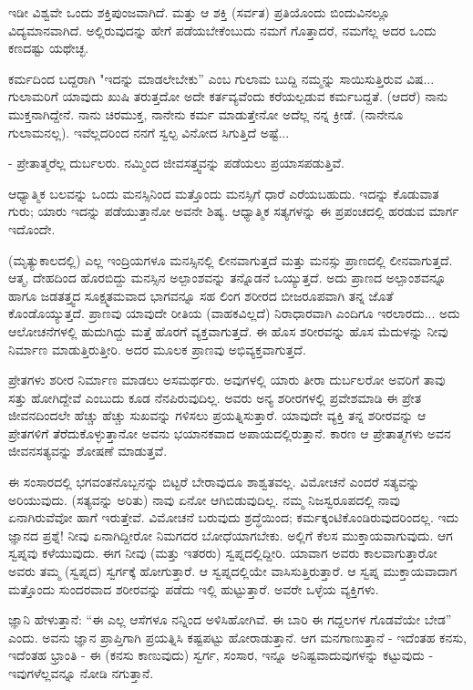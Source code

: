 ಇಡೀ ವಿಶ್ವವೇ ಒಂದು ಶಕ್ತಿಪುಂಜವಾಗಿದೆ. ಮತ್ತು ಆ ಶಕ್ತಿ (ಸರ್ವತ) ಪ್ರತಿಯೊಂದು ಬಿಂದುವಿನಲ್ಲೂ ವಿದ್ಯಮಾನವಾಗಿದೆ. ಅಲ್ಲಿರುವುದನ್ನು ಹೇಗೆ ಪಡೆಯಬೇಕೆಂಬುದು ನಮಗೆ ಗೊತ್ತಾದರೆ, ನಮಗೆಲ್ಲ ಅದರ ಒಂದು ಕಣದಷ್ಟು ಯಥೇಚ್ಛ.

ಕರ್ಮದಿಂದ ಬದ್ದರಾಗಿ "ಇದನ್ನು ಮಾಡಲೇಬೇಕು” ಎಂಬ ಗುಲಾಮ ಬುದ್ದಿ ನಮ್ಮನ್ನು ಸಾಯಿಸುತ್ತಿರುವ ವಿಷ... ಗುಲಾಮರಿಗೆ ಯಾವುದು ಖುಷಿ ತರುತ್ತದೋ ಅದೇ ಕರ್ತವ್ಯವೆಂದು ಕರೆಯಲ್ಪಡುವ ಕರ್ಮಬದ್ದತೆ. (ಆದರೆ) ನಾನು ಮುಕ್ತನಾಗಿದ್ದೇನೆ. ನಾನು ಚಿರಮುಕ್ತ, ನಾನೇನು ಕರ್ಮ ಮಾಡುತ್ತೇನೋ ಅದೆಲ್ಲ ನನ್ನ ಕ್ರೀಡೆ. (ನಾನೇನೂ ಗುಲಾಮನಲ್ಲ). ಇವೆಲ್ಲದರಿಂದ ನನಗೆ ಸ್ವಲ್ಪ ವಿನೋದ ಸಿಗುತ್ತಿದೆ ಅಷ್ಟೆ...

- ಪ್ರೇತಾತ್ಮರೆಲ್ಲ ದುರ್ಬಲರು. ನಮ್ಮಿಂದ ಜೀವಸತ್ತ್ವವನ್ನು ಪಡೆಯಲು ಪ್ರಯಾಸಪಡುತ್ತಿವೆ.

ಆಧ್ಯಾತ್ಮಿಕ ಬಲವನ್ನು ಒಂದು ಮನಸ್ಸಿನಿಂದ ಮತ್ತೊಂದು ಮನಸ್ಸಿಗೆ ಧಾರೆ ಎರೆಯಬಹುದು. ಇದನ್ನು ಕೊಡುವಾತ ಗುರು; ಯಾರು ಇದನ್ನು ಪಡೆಯುತ್ತಾನೋ ಅವನೇ ಶಿಷ್ಯ. ಆಧ್ಯಾತ್ಮಿಕ ಸತ್ಯಗಳನ್ನು ಈ ಪ್ರಪಂಚದಲ್ಲಿ ಹರಡುವ ಮಾರ್ಗ ಇದೊಂದೇ.

(ಮೃತ್ಯುಕಾಲದಲ್ಲಿ) ಎಲ್ಲ ಇಂದ್ರಿಯಗಳೂ ಮನಸ್ಸಿನಲ್ಲಿ ಲೀನವಾಗುತ್ತದೆ ಮತ್ತು ಮನಸ್ಸು ಪ್ರಾಣದಲ್ಲಿ ಲೀನವಾಗುತ್ತದೆ. ಆತ್ಮ, ದೇಹದಿಂದ ಹೊರಬಿದ್ದು ಮನಸ್ಸಿನ ಅಲ್ಪಾಂಶವನ್ನು ತನ್ನೊಡನೆ ಒಯ್ಯುತ್ತದೆ. ಅದು ಪ್ರಾಣದ ಅಲ್ಪಾಂಶವನ್ನೂ ಹಾಗೂ ಜಡತತ್ತ್ವದ ಸೂಕ್ಷ್ಮತಮವಾದ ಭಾಗವನ್ನೂ ಸಹ ಲಿಂಗ ಶರೀರದ ಬೀಜರೂಪವಾಗಿ ತನ್ನ ಜೊತೆ ಕೊಂಡೊಯ್ಯುತ್ತದೆ. ಪ್ರಾಣವು ಯಾವುದೇ ರೀತಿಯ (ವಾಹಕವಿಲ್ಲದೆ) ನಿರಾಧಾರವಾಗಿ ಎಂದಿಗೂ ಇರಲಾರದು... ಅದು ಆಲೋಚನೆಗಳಲ್ಲಿ ಹುದುಗಿದ್ದು ಮತ್ತೆ ಹೊರಗೆ ವ್ಯಕ್ತವಾಗುತ್ತದೆ. ಈ ಹೊಸ ಶರೀರವನ್ನು ಹೊಸ ಮೆದುಳನ್ನು ನೀವು ನಿರ್ಮಾಣ ಮಾಡುತ್ತಿರುತ್ತೀರಿ. ಅದರ ಮೂಲಕ ಪ್ರಾಣವು ಅಭಿವ್ಯಕ್ತವಾಗುತ್ತದೆ.

ಪ್ರೇತಗಳು ಶರೀರ ನಿರ್ಮಾಣ ಮಾಡಲು ಅಸಮರ್ಥರು. ಅವುಗಳಲ್ಲಿ ಯಾರು ತೀರಾ ದುರ್ಬಲರೋ ಅವರಿಗೆ ತಾವು ಸತ್ತು ಹೋಗಿದ್ದೇವೆ ಎಂಬುದು ಕೂಡ ನೆನಪಿರುವುದಿಲ್ಲ. ಅವರು ಅನ್ಯ ಶರೀರಗಳಲ್ಲಿ ಪ್ರವೇಶಮಾಡಿ ಈ ಪ್ರೇತ ಜೀವನದಿಂದಲೇ ಹೆಚ್ಚು ಹೆಚ್ಚು ಸುಖವನ್ನು ಗಳಿಸಲು ಪ್ರಯತ್ನಿಸುತ್ತಾರೆ. ಯಾವುದೇ ವ್ಯಕ್ತಿ ತನ್ನ ಶರೀರವನ್ನು ಆ ಪ್ರೇತಗಳಿಗೆ ತೆರೆದುಕೊಳ್ಳುತ್ತಾನೋ ಅವನು ಭಯಾನಕವಾದ ಅಪಾಯದಲ್ಲಿರುತ್ತಾನೆ. ಕಾರಣ ಆ ಪ್ರೇತಾತ್ಮಗಳು ಅವನ ಜೀವನಸತ್ಯವನ್ನು ಶೋಷಣೆ ಮಾಡುತ್ತವೆ.

ಈ ಸಂಸಾರದಲ್ಲಿ ಭಗವಂತನೊಬ್ಬನನ್ನು ಬಿಟ್ಟರೆ ಬೇರಾವುದೂ ಶಾಶ್ವತವಲ್ಲ. ವಿಮೋಚನೆ ಎಂದರೆ ಸತ್ಯವನ್ನು ಅರಿಯುವುದು. (ಸತ್ಯವನ್ನು ಅರಿತು) ನಾವು ಏನೋ ಆಗಿಬಿಡುವುದಿಲ್ಲ. ನಮ್ಮ ನಿಜಸ್ವರೂಪದಲ್ಲಿ ನಾವು ಏನಾಗಿರುವೆವೋ ಹಾಗೆ ಇರುತ್ತೇವೆ. ವಿಮೋಚನೆ ಬರುವುದು ಶ್ರದ್ಧೆಯಿಂದ; ಕರ್ಮಕ್ಕಂಟಿಕೊಂಡಿರುವುದರಿಂದಲ್ಲ. ಇದು ಜ್ಞಾನದ ಪ್ರಶ್ನೆ! ನೀವು ಏನಾಗಿದ್ದೀರೋ ನಿಮಗದರ ಬೋಧೆಯಾಗಬೇಕು. ಅಲ್ಲಿಗೆ ಕೆಲಸ ಮುಕ್ತಾಯವಾಗುವುದು. ಆಗ ಸ್ವಪ್ನವು ಕಳೆಯುವುದು. ಈಗ ನೀವು (ಮತ್ತು ಇತರರು) ಸ್ವಪ್ನದಲ್ಲಿದ್ದೀರಿ. ಯಾವಾಗ ಅವರು ಕಾಲವಾಗುತ್ತಾರೋ ಅವರು ತಮ್ಮ (ಸ್ವಪ್ನದ) ಸ್ವರ್ಗಕ್ಕೆ ಹೋಗುತ್ತಾರೆ. ಆ ಸ್ವಪ್ನದಲ್ಲಿಯೇ ವಾಸಿಸುತ್ತಿರುತ್ತಾರೆ. ಆ ಸ್ವಪ್ನ ಮುಕ್ತಾಯವಾದಾಗ ಮತ್ತೊಂದು ಸುಂದರವಾದ ಶರೀರವನ್ನು ಪಡೆದು ಇಲ್ಲಿ ಹುಟ್ಟುತ್ತಾರೆ. ಅವರೇ ಒಳ್ಳೆಯ ವ್ಯಕ್ತಿಗಳು.

ಜ್ಞಾನಿ ಹೇಳುತ್ತಾನೆ: “ಈ ಎಲ್ಲ ಆಸೆಗಳೂ ನನ್ನಿಂದ ಅಳಿಸಿಹೋಗಿವೆ. ಈ ಬಾರಿ ಈ ಗದ್ದಲಗಳ ಗೊಡವೆಯೇ ಬೇಡ'' ಎಂದು. ಅವನು ಜ್ಞಾನ ಪ್ರಾಪ್ತಿಗಾಗಿ ಪ್ರಯತ್ನಿಸಿ ಕಷ್ಟಪಟ್ಟು ಹೋರಾಡುತ್ತಾನೆ. ಆಗ ಮನಗಾಣುತ್ತಾನೆ - ಇದೆಂತಹ ಕನಸು, ಇದೆಂತಹ ಭ್ರಾಂತಿ - ಈ (ಕನಸು ಕಾಣುವುದು) ಸ್ವರ್ಗ, ಸಂಸಾರ, ಇನ್ನೂ ಅನಿಷ್ಟವಾದುವುಗಳನ್ನು ಕಟ್ಟುವುದು - ಇವುಗಳೆಲ್ಲವನ್ನೂ ನೋಡಿ ನಗುತ್ತಾನೆ.

